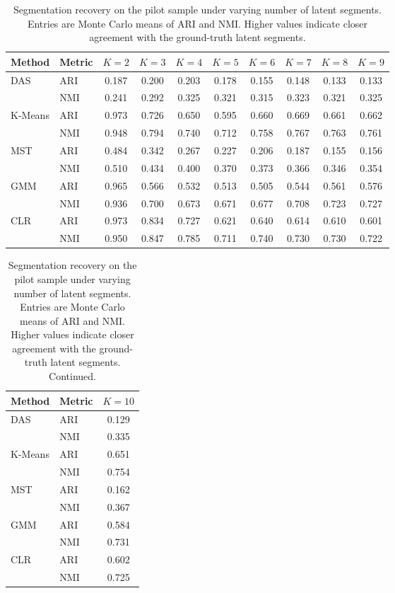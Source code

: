 \begin{table}[htbp]
\centering
\caption{Segmentation recovery on the pilot sample under varying number of latent segments. Entries are Monte Carlo means of ARI and NMI. Higher values indicate closer agreement with the ground-truth latent segments.}
\label{tab:app-ari-nmi-varying-K}
\begin{tabular}{llcccccccc}
\toprule
Method & Metric & $K=2$ & $K=3$ & $K=4$ & $K=5$ & $K=6$ & $K=7$ & $K=8$ & $K=9$ \\
\midrule
DAS & ARI & 0.187 & 0.200 & 0.203 & 0.178 & 0.155 & 0.148 & 0.133 & 0.133 \\
 & NMI & 0.241 & 0.292 & 0.325 & 0.321 & 0.315 & 0.323 & 0.321 & 0.325 \\
\addlinespace
K-Means & ARI & 0.973 & 0.726 & 0.650 & 0.595 & 0.660 & 0.669 & 0.661 & 0.662 \\
 & NMI & 0.948 & 0.794 & 0.740 & 0.712 & 0.758 & 0.767 & 0.763 & 0.761 \\
\addlinespace
MST & ARI & 0.484 & 0.342 & 0.267 & 0.227 & 0.206 & 0.187 & 0.155 & 0.156 \\
 & NMI & 0.510 & 0.434 & 0.400 & 0.370 & 0.373 & 0.366 & 0.346 & 0.354 \\
\addlinespace
GMM & ARI & 0.965 & 0.566 & 0.532 & 0.513 & 0.505 & 0.544 & 0.561 & 0.576 \\
 & NMI & 0.936 & 0.700 & 0.673 & 0.671 & 0.677 & 0.708 & 0.723 & 0.727 \\
\addlinespace
CLR & ARI & 0.973 & 0.834 & 0.727 & 0.621 & 0.640 & 0.614 & 0.610 & 0.601 \\
 & NMI & 0.950 & 0.847 & 0.785 & 0.711 & 0.740 & 0.730 & 0.730 & 0.722 \\
\bottomrule
\end{tabular}
\end{table}

\begin{table}[htbp]
\centering
\caption{Segmentation recovery on the pilot sample under varying number of latent segments. Entries are Monte Carlo means of ARI and NMI. Higher values indicate closer agreement with the ground-truth latent segments. Continued.}
\label{tab:app-ari-nmi-varying-K-cont}
\begin{tabular}{llc}
\toprule
Method & Metric & $K=10$ \\
\midrule
DAS & ARI & 0.129 \\
 & NMI & 0.335 \\
\addlinespace
K-Means & ARI & 0.651 \\
 & NMI & 0.754 \\
\addlinespace
MST & ARI & 0.162 \\
 & NMI & 0.367 \\
\addlinespace
GMM & ARI & 0.584 \\
 & NMI & 0.731 \\
\addlinespace
CLR & ARI & 0.602 \\
 & NMI & 0.725 \\
\bottomrule
\end{tabular}
\end{table}
